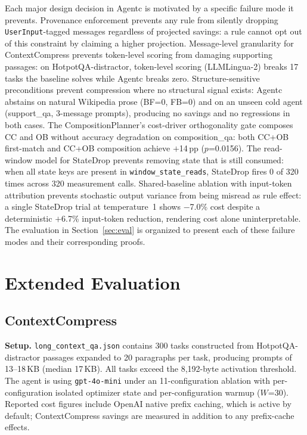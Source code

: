 \documentclass[sigconf,9pt]{acmart}
\begin{document}
Each major design decision in Agentc is motivated by a specific failure mode it
prevents. Provenance enforcement prevents any rule from silently dropping
\texttt{UserInput}-tagged messages regardless of projected savings: a rule cannot
opt out of this constraint by claiming a higher projection. Message-level granularity
for ContextCompress prevents token-level scoring from damaging supporting passages:
on HotpotQA-distractor, token-level scoring (LLMLingua-2) breaks 17 tasks the
baseline solves while Agentc breaks zero. Structure-sensitive preconditions prevent
compression where no structural signal exists: Agentc abstains on natural Wikipedia
prose (BF=0, FB=0) and on an unseen cold agent (support\_qa, 3-message prompts),
producing no savings and no regressions in both cases. The CompositionPlanner's
cost-driver orthogonality gate composes CC and OB without accuracy degradation on
composition\_qa: both CC+OB first-match and CC+OB composition achieve $+$14\,pp
($p$=0.0156). The read-window model for StateDrop prevents removing state that is
still consumed: when all state keys are present in \texttt{window\_state\_reads},
StateDrop fires 0 of 320 times across 320 measurement calls. Shared-baseline
ablation with input-token attribution prevents stochastic output variance from being
misread as rule effect: a single StateDrop trial at temperature~1 shows $-$7.0\% cost
despite a deterministic $+$6.7\% input-token reduction, rendering cost alone
uninterpretable. The evaluation in Section~\ref{sec:eval} is organized to present
each of these failure modes and their corresponding proofs.


\section{Extended Evaluation}
\label{app:eval}
\subsection{ContextCompress}
\label{sec:eval-cc}

\textbf{Setup.} \texttt{long\_context\_qa.json} contains 300 tasks constructed from
HotpotQA-distractor passages expanded to 20 paragraphs per task, producing prompts of
13--18\,KB (median 17\,KB). All tasks exceed the 8,192-byte activation threshold. The
agent is  using \texttt{gpt-4o-mini} under
an 11-configuration ablation with per-configuration isolated optimizer state and
per-configuration warmup ($W$=30). Reported cost figures include OpenAI native prefix
caching, which is active by default; ContextCompress savings are measured in addition
to any prefix-cache effects.
\end{document}
